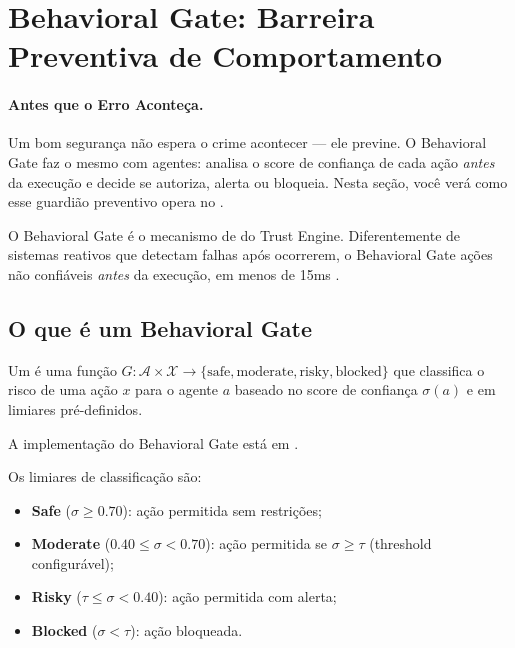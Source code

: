 \section{Behavioral Gate: Barreira Preventiva de Comportamento}
\label{sec:behavioral-gate}
\nivelavancado

\paragraph{Antes que o Erro Aconteça.}
Um bom segurança não espera o crime acontecer --- ele previne.
O Behavioral Gate faz o mesmo com agentes: analisa o score de
confiança de cada ação \emph{antes} da execução e decide se
autoriza, alerta ou bloqueia. Nesta seção, você verá como esse
guardião preventivo opera no \opencodeeco{}.

O Behavioral Gate é o mecanismo de  do
Trust Engine. Diferentemente de sistemas reativos que detectam falhas
após ocorrerem, o Behavioral Gate  ações não
confiáveis \emph{antes} da execução, em menos de 15ms \cite{opencode2026spec038}.

\subsection{O que é um Behavioral Gate}

\begin{definicao}
Um  é uma função $G: \mathcal{A} \times
\mathcal{X} \to \{\text{safe}, \text{moderate}, \text{risky},
\text{blocked}\}$ que classifica o risco de uma ação $x$ para o
agente $a$ baseado no score de confiança $\sigma(a)$ e em limiares
pré-definidos.
\end{definicao}

A implementação do Behavioral Gate está em
.

Os limiares de classificação são:
\begin{itemize}
\item \textbf{Safe} ($\sigma \geq 0.70$): ação permitida sem
restrições;
\item \textbf{Moderate} ($0.40 \leq \sigma < 0.70$): ação permitida
se $\sigma \geq \tau$ (threshold configurável);
\item \textbf{Risky} ($\tau \leq \sigma < 0.40$): ação permitida com
alerta;
\item \textbf{Blocked} ($\sigma < \tau$): ação bloqueada.
\end{itemize}

